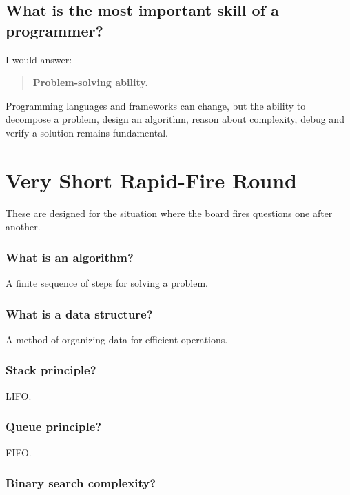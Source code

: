 \medskip

\subsection{What is the most important skill of a programmer?}

I would answer:

\begin{quote}
\textbf{Problem-solving ability.}\\
\end{quote}

Programming languages and frameworks can change, but the ability to decompose a problem, design an algorithm, reason about complexity, debug and verify a solution remains fundamental.

\medskip

\section{Very Short Rapid-Fire Round}

These are designed for the situation where the board fires questions one after another.

\subsubsection{What is an algorithm?}

A finite sequence of steps for solving a problem.

\subsubsection{What is a data structure?}

A method of organizing data for efficient operations.

\subsubsection{Stack principle?}

LIFO.

\subsubsection{Queue principle?}

FIFO.

\subsubsection{Binary search complexity?}

